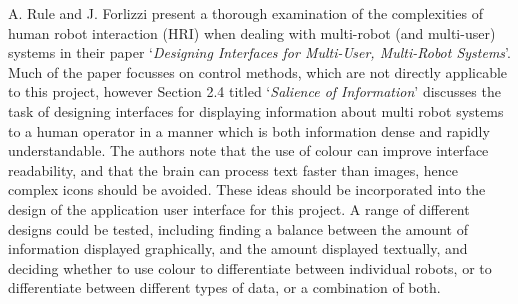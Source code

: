 \documentclass[titlepage,hidelinks,10pt]{article}
\begin{document}
A. Rule and J. Forlizzi present a thorough examination of the complexities of human robot interaction (HRI) when dealing with multi-robot (and multi-user) systems in their paper `\textit{Designing Interfaces for Multi-User, Multi-Robot Systems}\cite{DesginingInterfaces}'. Much of the paper focusses on control methods, which are not directly applicable to this project, however Section 2.4 titled `\textit{Salience of Information}' discusses the task of designing interfaces for displaying information about multi robot systems to a human operator in a manner which is both information dense and rapidly understandable. The authors note that the use of colour can improve interface readability\cite{InterfaceColour}, and that the brain can process text faster than images, hence complex icons should be avoided\cite{InterfaceText}. These ideas should be incorporated into the design of the application user interface for this project. A range of different designs could be tested, including finding a balance between the amount of information displayed graphically, and the amount displayed textually, and deciding whether to use colour to differentiate between individual robots, or to differentiate between different types of data, or a combination of both.
\end{document}

